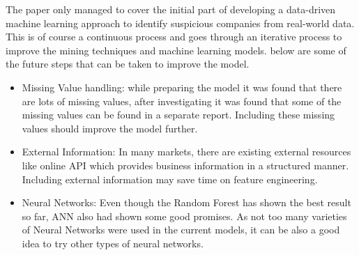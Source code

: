 
The paper only managed to cover the initial part of developing a data-driven machine learning approach to identify suspicious companies from real-world data. This is of course a continuous process and goes through an iterative process to improve the mining techniques and machine learning models.  below are some of the future steps that can be taken to improve the model. 


\begin{itemize}
    \item Missing Value handling: while preparing the model it was found that there are lots of missing values, after investigating it was found that some of the missing values can be found in a separate report. Including these missing values should improve the model further. 
    \item External Information: In many markets, there are existing external resources like online API which provides business information in a structured manner. Including external information may save time on feature engineering. 
    \item Neural Networks: Even though the Random Forest has shown the best result so far, ANN also had shown some good promises. As not too many varieties of Neural Networks were used in the current models, it can be also a good idea to try other types of neural networks. 
\end{itemize}